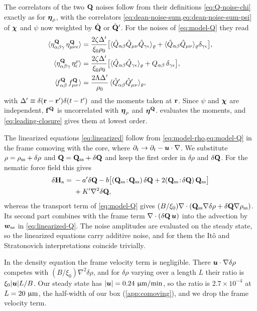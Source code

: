 \documentclass[aps,pre,reprint,superscriptaddress,longbibliography,nofootinbib
]{revtex4-2}
\begin{document}
The correlators of the two $\Q$ noises follow from their
definitions \cref{eq:Q-noise-chi} exactly as for
$\bEta_\rho$, with the correlators
\cref{eq:dean-noise-sum,eq:dean-noise-sum-psi} of $\bs\chi$
and $\psi$ now weighted by $\hat\Q$ or $\hat\Q'$. For the
noises of \cref{eq:model-Q} they read
\begin{align}
  \label{eq:Q-noise-correlators}
  \langle\eta^\Q_{\ab\gamma}\,\eta^\Q_{\mn\epsilon}\rangle &= \frac{2\zeta\Delta'}{\xi_0\rho_0}
  \bigl[\langle\hat Q_\ab\hat Q_\mn\hat Q_{\gamma\epsilon}\rangle_\varrho
  + \langle\hat Q_\ab\hat Q_\mn\rangle_\varrho\delta_{\gamma\epsilon}\bigr],
  \nonumber\\
  \langle\eta^\Q_{\ab\gamma}\,\eta^\rho_\epsilon\rangle &= \frac{2\zeta\Delta'}{\xi_0\rho_0}
  \bigl[\langle\hat Q_\ab\hat Q_{\gamma\epsilon}\rangle_\varrho + Q_\ab\,\delta_{\gamma\epsilon}\bigr],
  \nonumber\\
  \langle\!f^\Q_\ab\,f^\Q_\mn\rangle &= \frac{2\Lambda\Delta'}{\rho_0}\,
  \langle\hat Q'_\ab\hat Q'_\mn\rangle_\varrho,
\end{align}
with $\Delta'\equiv\delta(\r-\r')\delta(t-t')$ and the
moments taken at $\r$. Since $\psi$ and $\bs\chi$ are
independent, $\f^\Q$ is uncorrelated with $\bEta_\rho$ and
$\bEta^\Q$.  evaluates the moments, and
\cref{eq:leading-closure} gives them at lowest order.

The linearized equations \cref{eq:linearized} follow from
\cref{eq:model-rho,eq:model-Q} in the frame comoving with
the core, where $\partial_t\to\partial_t-\u\cdot\nabla$. We
substitute $\rho=\rho_\ss+\delta\rho$ and
$\Q=\Q_\ss+\delta\Q$ and keep the first order in
$\delta\rho$ and $\delta\Q$. For the nematic force field
this gives
\begin{align}
  \label{eq:dH-active}
  \delta\Ha = {}& -a'\delta\Q
  - b\bigl[(\Q_\ss\!:\!\Q_\ss)\,\delta\Q + 2(\Q_\ss\!:\!\delta\Q)\,\Q_\ss\bigr]
  \nonumber\\
  &+ K'\nabla^2\delta\Q ,
\end{align}
whereas the transport term of \cref{eq:model-Q} gives
$(B/\xi_0)\nabla\cdot(\Q_\ss\nabla\delta\rho+\delta\Q\nabla\rho_\ss)$.
Its second part combines with the frame term
$\nabla\cdot(\delta\Q\,\u)$ into the advection by $\bs
w_\ss$ in \cref{eq:linearized-Q}. The noise amplitudes are
evaluated on the steady state, so the linearized equations
carry additive noise, and for them the It\^o and
Stratonovich interpretations coincide trivially.

In the density equation the frame velocity term is
negligible. There $\u\cdot\nabla\delta\rho$ competes with
$(B/\xi_0)\nabla^2\delta\rho$, and for $\delta\rho$ varying
over a length $L$ their ratio is $\xi_0|\u|L/B$. Our steady
state has $|\u|=0.24~\micron/\minute$, so the ratio is
$2.7\times10^{-4}$ at $L=20~\micron$, the half-width of our
box (\cref{app:comoving}), and we drop the frame velocity
term.
\end{document}
